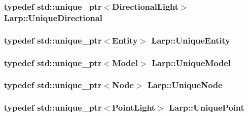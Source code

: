 \subsubsection[{\texorpdfstring{Unique\+Directional}{UniqueDirectional}}]{\setlength{\rightskip}{0pt plus 5cm}typedef std\+::unique\+\_\+ptr$<${\bf Directional\+Light}$>$ {\bf Larp\+::\+Unique\+Directional}}\hypertarget{namespaceLarp_af87ce889468b60d51aa1479335ba19bf}{}\label{namespaceLarp_af87ce889468b60d51aa1479335ba19bf}
\subsubsection[{\texorpdfstring{Unique\+Entity}{UniqueEntity}}]{\setlength{\rightskip}{0pt plus 5cm}typedef std\+::unique\+\_\+ptr$<${\bf Entity}$>$ {\bf Larp\+::\+Unique\+Entity}}\hypertarget{namespaceLarp_ad6d203c6dc3d8ea7a5517a64e1665403}{}\label{namespaceLarp_ad6d203c6dc3d8ea7a5517a64e1665403}
\subsubsection[{\texorpdfstring{Unique\+Model}{UniqueModel}}]{\setlength{\rightskip}{0pt plus 5cm}typedef std\+::unique\+\_\+ptr$<${\bf Model}$>$ {\bf Larp\+::\+Unique\+Model}}\hypertarget{namespaceLarp_a6e9a93e4118b723d56766c7ae7e1e94a}{}\label{namespaceLarp_a6e9a93e4118b723d56766c7ae7e1e94a}
\subsubsection[{\texorpdfstring{Unique\+Node}{UniqueNode}}]{\setlength{\rightskip}{0pt plus 5cm}typedef std\+::unique\+\_\+ptr$<${\bf Node}$>$ {\bf Larp\+::\+Unique\+Node}}\hypertarget{namespaceLarp_ad95a88bc34f8c78cefd64c9bbeb94a58}{}\label{namespaceLarp_ad95a88bc34f8c78cefd64c9bbeb94a58}
\subsubsection[{\texorpdfstring{Unique\+Point}{UniquePoint}}]{\setlength{\rightskip}{0pt plus 5cm}typedef std\+::unique\+\_\+ptr$<${\bf Point\+Light}$>$ {\bf Larp\+::\+Unique\+Point}}\hypertarget{namespaceLarp_acd7cacff15535544525abc2e90e07b91}{}\label{namespaceLarp_acd7cacff15535544525abc2e90e07b91}
